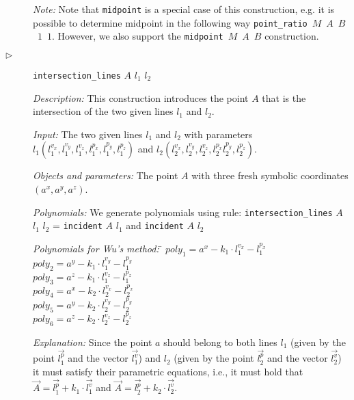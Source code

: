 \documentclass[final,1p,times,authoryear]{elsarticle}
\begin{document}
\begin{description}
{\em Note:} Note that {\tt midpoint} is a special case of this
construction, e.g. it is possible to determine midpoint in the
following way \mbox{{\tt point\_ratio} $M$ $A$ $B$ $1$ $1$}. However,
we also support the \mbox{{\tt midpoint} $M$ $A$ $B$} construction.

\item[$\triangleright$] {\tt intersection\_lines} $A$ $l_1$ $l_2$

  {\em Description:} This construction introduces the point $A$ that is
  the intersection of the two given lines $l_1$ and $l_2$.

  {\em Input:} The two given lines $l_1$ and $l_2$ with parameters
  $l_1(l_1^{v_x}, l_1^{v_y}, l_1^{v_z}, l_1^{p_x}, l_1^{p_y},
  l_1^{p_z})$ and $l_2(l_2^{v_x}, l_2^{v_y}, l_2^{v_z}, l_2^{p_x}
  l_2^{p_y}, l_2^{p_z})$.

  {\em Objects and parameters:} The point $A$ with three fresh
  symbolic coordinates $(a^x, a^y, a^z)$.

  {\em Polynomials:} We generate polynomials using rule:
  {\tt intersection\_lines} $A$ $l_1$ $l_2$ = {\tt incident} $A$ $l_1$ and {\tt incident} $A$ $l_2$

\begin{tabbing}
{\em Polynomials for Wu's method:} \= $poly_1 = a^x - k_1\cdot l_1^{v_x} - l_1^{p_x}$ \\
                   \> $poly_2 = a^y - k_1\cdot l_1^{v_y} - l_1^{p_y}$ \\
                   \> $poly_3 = a^z - k_1\cdot l_1^{v_z} - l_1^{p_z}$ \\
                   \> $poly_4 = a^x - k_2\cdot l_2^{v_x} - l_2^{p_x}$ \\
                   \> $poly_5 = a^y - k_2\cdot l_2^{v_y} - l_2^{p_y}$ \\
                   \> $poly_6 = a^z - k_2\cdot l_2^{v_z} - l_2^{p_z}$
\end{tabbing}

{\em Explanation:} 
Since the point $a$ should belong to both lines $l_1$ (given by the
point $\overrightarrow{l_1^p}$ and the vector
$\overrightarrow{l_1^v}$) and $l_2$ (given by the point
$\overrightarrow{l_2^p}$ and the vector $\overrightarrow{l_2^v}$) it
must satisfy their parametric equations, i.e., it must hold that
$\overrightarrow{A} = \overrightarrow{l_1^p} + k_1 \cdot
\overrightarrow{l_1^v}$
and
$\overrightarrow{A} = \overrightarrow{l_2^p} + k_2 \cdot
\overrightarrow{l_2^v}$.


\end{description}
\end{document}
